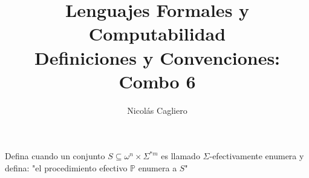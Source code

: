 \documentclass{article}
\title{Lenguajes Formales y Computabilidad \\
        \large Definiciones y Convenciones: Combo 6 }
\author{Nicolás Cagliero}
\begin{document}
\maketitle

Defina cuando un conjunto $S \subseteq \omega^n \times \Sigma^{*m}$
es llamado $\Sigma$-efectivamente enumera y defina: "el procedimiento
efectivo $\mathbb{P}$ enumera a $S$"
\end{document}
